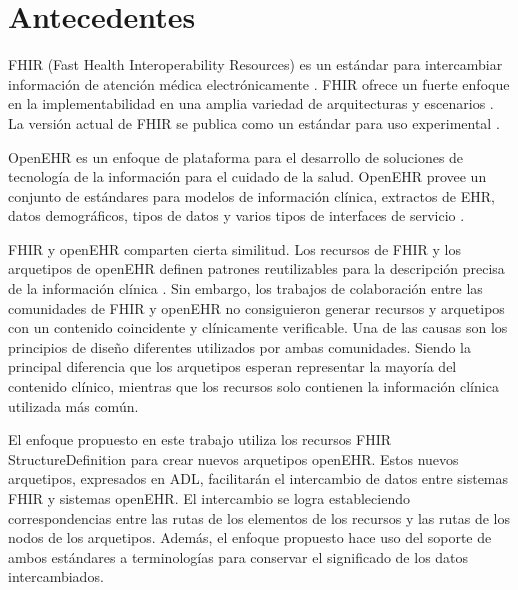 \section{Antecedentes}

FHIR (Fast Health Interoperability Resources) es un estándar para intercambiar información de atención médica electrónicamente \cite{FHIRClinician}. FHIR ofrece un fuerte enfoque en la implementabilidad en una amplia variedad de arquitecturas y escenarios \cite{FHIRExecutive}. La versión actual de FHIR se publica como un estándar para uso experimental \cite{FHIR}.

OpenEHR es un enfoque de plataforma para el desarrollo de soluciones de tecnología de la información para el cuidado de la salud. OpenEHR provee un conjunto de estándares para modelos de información clínica, extractos de EHR, datos demográficos, tipos de datos y varios tipos de interfaces de servicio \cite{openEHRWhitePaper}.





FHIR y openEHR comparten cierta similitud. Los recursos de FHIR y los arquetipos de openEHR definen patrones reutilizables para la descripción precisa de la información clínica \cite{Bosca15}. Sin embargo, los trabajos de colaboración entre las comunidades de FHIR y openEHR \cite{Collaboration} no consiguieron generar recursos y arquetipos con un contenido coincidente y clínicamente verificable. Una de las causas son los principios de diseño diferentes utilizados por ambas comunidades. Siendo la principal diferencia que los arquetipos esperan representar la mayoría del contenido clínico, mientras que los recursos solo contienen la información clínica utilizada más común.

El enfoque propuesto en este trabajo utiliza los recursos FHIR StructureDefinition para crear nuevos arquetipos openEHR. Estos nuevos arquetipos, expresados en ADL, facilitarán el intercambio de datos entre sistemas FHIR y sistemas openEHR. El intercambio se logra estableciendo correspondencias entre las rutas de los elementos de los recursos y las rutas de los nodos de los arquetipos. Además, el enfoque propuesto hace uso del soporte de ambos estándares a terminologías para conservar el significado de los datos intercambiados.
